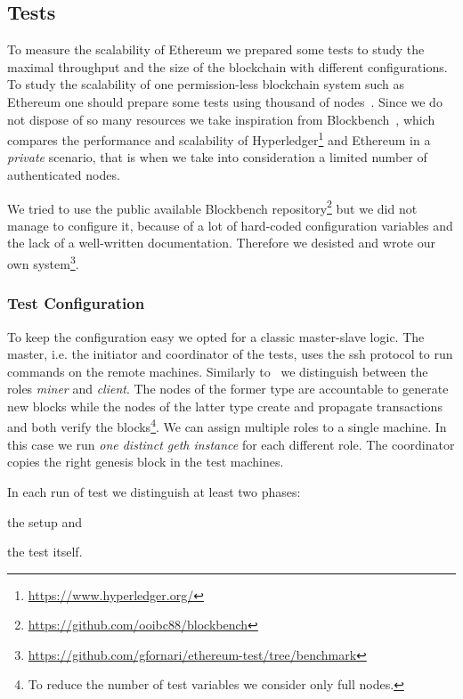 \subsection{Tests}
\label{sec:tests}

To measure the scalability of Ethereum we prepared some tests to study the
maximal throughput and the size of the blockchain with different configurations.
To study the scalability of one permission-less blockchain system such as
Ethereum one should prepare some tests using thousand of
nodes~\cite{bib:securityAndScalabilityPoW, bib:algorand}. Since we do not
dispose of so many resources we take inspiration from
Blockbench~\cite{blockbench}, which compares the performance and scalability of
Hyperledger\footnote{\url{https://www.hyperledger.org/}} and Ethereum in a
\emph{private} scenario, that is when we take into consideration a limited
number of authenticated nodes.

We tried to use the public available Blockbench
repository\footnote{\url{https://github.com/ooibc88/blockbench}} but we did not
manage to configure it, because of a lot of hard-coded configuration variables
and the lack of a well-written documentation. Therefore we desisted and wrote
our own 
system\footnote{\url{https://github.com/gfornari/ethereum-test/tree/benchmark}}.


\subsubsection{Test Configuration}

To keep the configuration easy we opted for a classic master-slave logic. The
master, i.e. the initiator and coordinator of the tests, uses the ssh protocol
to run commands on the remote machines. Similarly to~\cite{blockbench} we
distinguish between the roles \emph{miner} and \emph{client}. The nodes of the
former type are accountable to generate new blocks while the nodes of the latter
type create and propagate transactions and both verify the blocks\footnote{To
reduce the number of test variables we consider only full nodes.}. We can assign
multiple roles to a single machine. In this case we run \emph{one distinct geth
instance} for each different role. The coordinator copies the right genesis
block in the test machines.

In each run of test we distinguish at least two phases:
\begin{enumerate*}
  \item the setup and
  \item the test itself.
\end{enumerate*}

